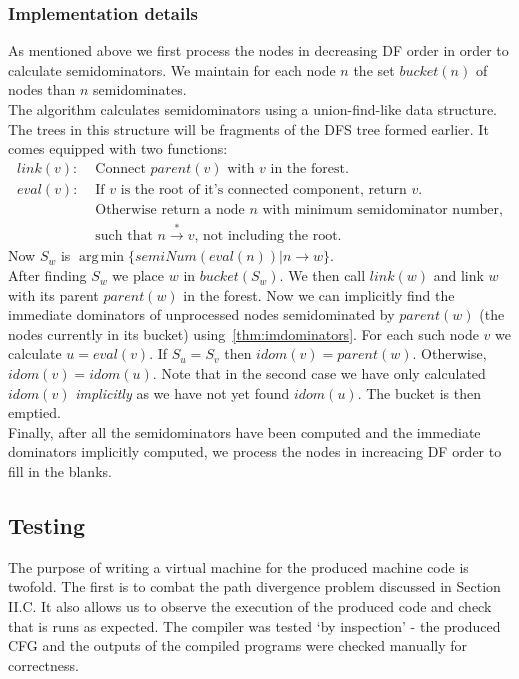 \documentclass[12pt,a4paper]{article}
\DeclareMathOperator*{\argmin}{arg\,min}
\begin{document}
\subsubsection{Implementation details}
As mentioned above we first process the nodes in decreasing DF order in order to calculate semidominators. We maintain for each node $n$ the set $bucket(n)$ of nodes
than $n$ semidominates.\\
The algorithm calculates semidominators using a union-find-like data structure. The trees in this structure will be fragments of the DFS tree formed earlier. It comes equipped with two functions:
\begin{align*}
link(v): &\text{ Connect $parent(v)$ with $v$ in the forest.}\\
eval(v): &\text{ If $v$ is the root of it's connected component, return $v$.}\\
   &\text{ Otherwise return a node $n$ with minimum semidominator number,}\\
   &\text{ such that $n \xrightarrow{*} v$,  not including the root.}
\end{align*}
Now $S_w$ is $\argmin\{semiNum(eval(n)) |n \to w\}$.\\
 After finding $S_w$ we place $w$ in $bucket(S_w)$. We then call $link(w)$ and link $w$ with its parent $parent(w)$ in the forest. Now we can implicitly find the immediate dominators of unprocessed nodes semidominated by $parent(w)$ (the nodes currently in its bucket) using~\cref{thm:imdominators}. 
 For each such node $v$ we calculate $u = eval(v)$. If $S_u = S_v$ then $idom(v) = parent(w)$. Otherwise, $idom(v) = idom(u)$. Note that in the second case we have only calculated $idom(v)$ \textit{implicitly} as we have not yet found $idom(u)$. 
 The bucket is then emptied.\\
Finally, after all the semidominators have been computed and the immediate dominators implicitly computed, we process the nodes in increacing DF order to fill in the blanks.\par

\subsection{Testing}
The purpose of writing a virtual machine for the produced machine code is twofold. The first is to combat the path divergence problem discussed in Section II.C. %
It also allows us to observe the execution of the produced code and check that is runs as expected. The compiler was tested `by inspection' - the produced CFG and the
outputs of the compiled programs were checked manually for correctness.
\end{document}
